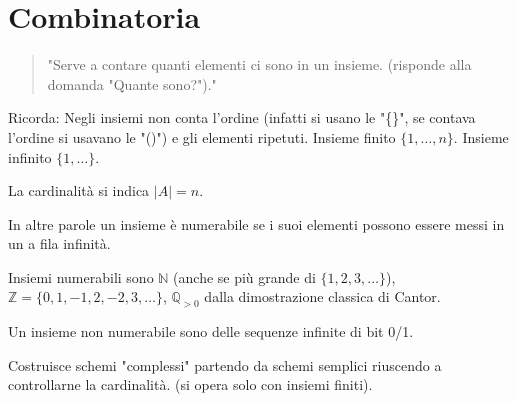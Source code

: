\section{Combinatoria}

\begin{quotation}
	"Serve a contare quanti elementi ci sono in un insieme.
	(risponde alla domanda "Quante sono?")."
\end{quotation}

Ricorda: Negli insiemi non conta l'ordine (infatti si usano le "\{\}", se contava l'ordine si usavano le "()") e gli elementi ripetuti. Insieme finito $\{1, \dots, n\}$. Insieme infinito $\{1,\dots\}$.


La cardinalità si indica $|A|=n$.





In altre parole un insieme è numerabile se i suoi elementi possono essere messi in un a fila infinità.

Insiemi numerabili sono $\mathbb{N}$ (anche se più grande di $\{1,2,3,\dots\}$), $\mathbb{Z}=\{0,1,-1,2,-2,3,\dots\}$, $\mathbb{Q}_{>0}$ dalla dimostrazione classica di Cantor.

Un insieme non numerabile sono delle sequenze infinite di bit 0/1.


Costruisce schemi "complessi" partendo da schemi semplici riuscendo a controllarne la cardinalità. (si opera solo con insiemi finiti).

